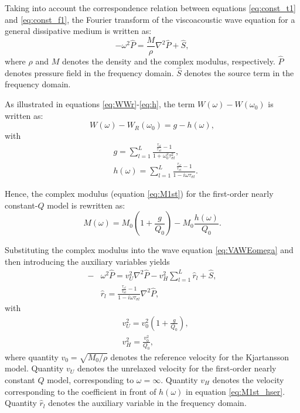 \documentclass[article]{./macros/elsarticle_qh}
\begin{document}
Taking into account the correspondence relation between equations \ref{eq:const_t1} and \ref{eq:const_f1}, the Fourier transform of the viscoacoustic wave equation for a general dissipative medium is written as:
\begin{equation} \label{eq:VAWEomega}
- \omega^2 \hat{P} = \frac{M}{\rho} \nabla^2 \hat{P} 
+ \hat{S},
\end{equation}
where $\rho$ and $M$ denotes the density and the complex modulus, respectively. $\hat{P}$ denotes pressure field in the frequency domain. $\hat{S}$ denotes the source term in the frequency domain.

As illustrated in equations \ref{eq:WWr}-\ref{eq:h}, the term $W(\omega)-W(\omega_{0})$ is written as:
\begin{equation} \label{WWR_tmp}
W(\omega) - W_{R}(\omega_{0}) = g - h(\omega)  ,
\end{equation}
with
\begin{align}
& g = \sum_{l=1}^{L} 
\frac{\frac{\tau_{\epsilon l}}{\tau_{\sigma l}}-1}
{1+\omega_{0}^2\tau_{\sigma l}^2} , \\
& h(\omega) = \sum_{l=1}^{L}
\frac{\frac{\tau_{\epsilon l}}{\tau_{\sigma l}}-1}
{1-i\omega\tau_{\sigma l}} .
\end{align}

Hence, the complex modulus (equation \ref{eq:M1st}) for the first-order nearly constant-$Q$ model is rewritten as:
\begin{equation} \label{eq:M1st_hser}
M(\omega) = M_{0} \left(1 + \frac{g}{Q_{0}} \right) -
M_{0} \frac{h(\omega)}{Q_{0}} .
\end{equation}

Substituting the complex modulus into the wave equation \ref{eq:VAWEomega} and then introducing the auxiliary variables yields  
\begin{equation} \label{eq:VWE1stomega}
\begin{split}
- & \omega^2 \hat{P} = v_{U}^2 \nabla^2 \hat{P} - v_{H}^2 \sum_{l=1}^{L} \hat{r}_{l} 
+ \hat{S}, \\
& \hat{r}_{l} =
\frac{\frac{\tau_{\epsilon l}}{\tau_{\sigma l}}-1}
{1-i\omega\tau_{\sigma l}} \nabla^2 \hat{P} ,
\end{split}
\end{equation}
with 
\begin{align}
& v_{U}^2 = v_{0}^2 \left(
1 + \frac{g}{Q_{0}} \right), \\
& v_{H}^2 = \frac{v_{0}^2}{Q_{0}}, 
\end{align}
where quantity $v_{0} = \sqrt{M_{0}/\rho}$ denotes the reference velocity for the Kjartansson model. Quantity $v_{U}$ denotes the unrelaxed velocity for the first-order nearly constant $Q$ model, corresponding to $\omega=\infty$.  Quantity $v_{H}$ denotes the velocity corresponding to the coefficient in front of $h(\omega)$ in equation \ref{eq:M1st_hser}. Quantity $\hat{r}_{l}$ denotes the auxiliary variable in the frequency domain.
\end{document}
